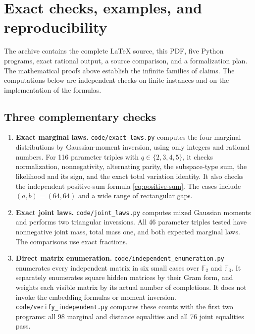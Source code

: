 \section{Exact checks, examples, and reproducibility}\label{sec:computation}

The archive contains the complete \LaTeX{} source, this PDF, five Python
programs, exact rational output, a source comparison, and a formalization
plan. The mathematical proofs above establish the infinite families of
claims. The computations below are independent checks on finite instances
and on the implementation of the formulas.

\subsection{Three complementary checks}

\begin{enumerate}[label=\arabic*.,leftmargin=*]
\item \textbf{Exact marginal laws.}
\texttt{code/exact\_laws.py} computes the four marginal distributions by
Gaussian-moment inversion, using only integers and rational numbers.
For 116 parameter triples with \(q\in\{2,3,4,5\}\), it checks normalization,
nonnegativity, alternating parity, the subspace-type sum, the likelihood
and its sign, and the exact total variation identity.
It also checks the independent positive-sum formula
\eqref{eq:positive-sum}. The cases include \((a,b)=(64,64)\) and a wide
range of rectangular gaps.

\item \textbf{Exact joint laws.}
\texttt{code/joint\_laws.py} computes mixed Gaussian moments and performs
two triangular inversions. All 46 parameter triples tested have
nonnegative joint mass, total mass one, and both expected marginal laws.
The comparisons use exact fractions.

\item \textbf{Direct matrix enumeration.}
\texttt{code/independent\_enumeration.py} enumerates every independent matrix
in six small cases over \(\mathbb F_2\) and \(\mathbb F_3\).
It separately enumerates square hidden matrices by their Gram form, and
weights each visible matrix by its actual number of completions.
It does not invoke the embedding formulas or moment inversion.
\texttt{code/verify\_independent.py} compares these counts with the first
two programs: all 98 marginal and distance equalities and all 76 joint
equalities pass.
\end{enumerate}


